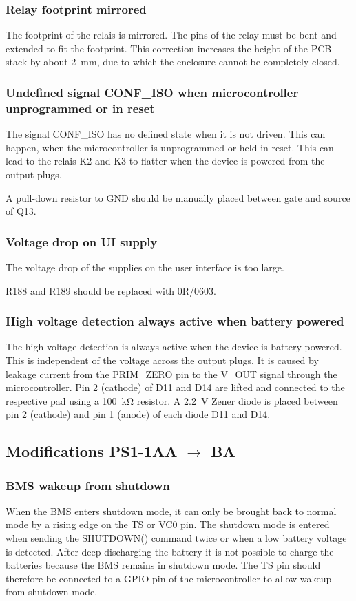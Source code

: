\subsubsection{Relay footprint mirrored}
The footprint of the relais is mirrored. The pins of the relay must be bent and extended to fit the footprint. This correction increases the height of the PCB stack by about \qty{2}{\milli\meter}, due to which the enclosure cannot be completely closed. 

\subsubsection{Undefined signal CONF\_ISO when microcontroller unprogrammed or in reset}
The signal CONF\_ISO has no defined state when it is not driven. This can happen, when the microcontroller is unprogrammed or held in reset. This can lead to the relais K2 and K3 to flatter when the device is powered from the output plugs. 

A pull-down resistor to GND should be manually placed between gate and source of Q13. 

\subsubsection{Voltage drop on UI supply}
The voltage drop of the supplies on the user interface is too large. 

R188 and R189 should be replaced with 0R/0603. 

\subsubsection{High voltage detection always active when battery powered}
The high voltage detection is always active when the device is battery-powered. This is independent of the voltage across the output plugs. It is caused by leakage current from the PRIM\_ZERO pin to the V\_OUT signal through the microcontroller. 
Pin 2 (cathode) of D11 and D14 are lifted and connected to the respective pad using a \qty{100}{\kilo\ohm} resistor. A \qty{2.2}{\volt} Zener diode is placed between pin 2 (cathode) and pin 1 (anode) of each diode D11 and D14. 

\subsection{Modifications PS1-1AA $\to$ BA}

\subsubsection{BMS wakeup from shutdown}
When the BMS enters shutdown mode, it can only be brought back to normal mode by a rising edge on the TS or VC0 pin. The shutdown mode is entered when sending the SHUTDOWN() command twice or when a low battery voltage is detected. After deep-discharging the battery it is not possible to charge the batteries because the BMS remains in shutdown mode. The TS pin should therefore be connected to a GPIO pin of the microcontroller to allow wakeup from shutdown mode. 


